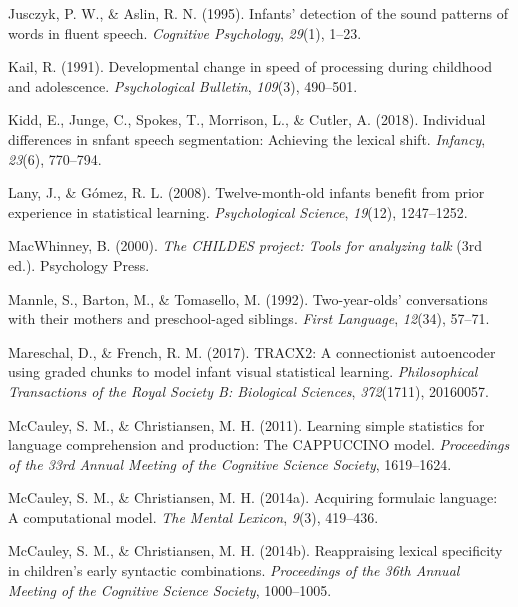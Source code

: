 \documentclass[man,mask,floatsintext]{apa6}
\begin{document}
\hypertarget{ref-jusczyk1995infants}{}
Jusczyk, P. W., \& Aslin, R. N. (1995). Infants' detection of the sound
patterns of words in fluent speech. \emph{Cognitive Psychology},
\emph{29}(1), 1--23.

\hypertarget{ref-kail1991developmental}{}
Kail, R. (1991). Developmental change in speed of processing during
childhood and adolescence. \emph{Psychological Bulletin}, \emph{109}(3),
490--501.

\hypertarget{ref-kidd2018individual}{}
Kidd, E., Junge, C., Spokes, T., Morrison, L., \& Cutler, A. (2018).
Individual differences in snfant speech segmentation: Achieving the
lexical shift. \emph{Infancy}, \emph{23}(6), 770--794.

\hypertarget{ref-lany2008twelve}{}
Lany, J., \& Gómez, R. L. (2008). Twelve-month-old infants benefit from
prior experience in statistical learning. \emph{Psychological Science},
\emph{19}(12), 1247--1252.

\hypertarget{ref-childes}{}
MacWhinney, B. (2000). \emph{The CHILDES project: Tools for analyzing
talk} (3rd ed.). Psychology Press.

\hypertarget{ref-mannle1992twoyearolds}{}
Mannle, S., Barton, M., \& Tomasello, M. (1992). Two-year-olds'
conversations with their mothers and preschool-aged siblings.
\emph{First Language}, \emph{12}(34), 57--71.

\hypertarget{ref-mareschal2017tracx2}{}
Mareschal, D., \& French, R. M. (2017). TRACX2: A connectionist
autoencoder using graded chunks to model infant visual statistical
learning. \emph{Philosophical Transactions of the Royal Society B:
Biological Sciences}, \emph{372}(1711), 20160057.

\hypertarget{ref-mccauley2011learning}{}
McCauley, S. M., \& Christiansen, M. H. (2011). Learning simple
statistics for language comprehension and production: The CAPPUCCINO
model. \emph{Proceedings of the 33rd Annual Meeting of the Cognitive
Science Society}, 1619--1624.

\hypertarget{ref-mccauley2014acquiring}{}
McCauley, S. M., \& Christiansen, M. H. (2014a). Acquiring formulaic
language: A computational model. \emph{The Mental Lexicon}, \emph{9}(3),
419--436.

\hypertarget{ref-mccauley2014reappraising}{}
McCauley, S. M., \& Christiansen, M. H. (2014b). Reappraising lexical
specificity in children's early syntactic combinations.
\emph{Proceedings of the 36th Annual Meeting of the Cognitive Science
Society}, 1000--1005.
\end{document}
